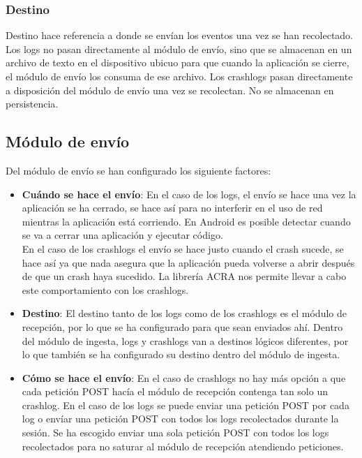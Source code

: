 \subsubsection{Destino}
Destino hace referencia a donde se envían los eventos una vez se han recolectado. 
Los logs no pasan directamente al módulo de envío, sino que se almacenan en un archivo de texto en el dispositivo ubicuo para que cuando la aplicación se cierre, el módulo de envío los consuma de ese archivo.
Los crashlogs pasan directamente a disposición del módulo de envío una vez se recolectan. No se almacenan en persistencia. 

\subsection{Módulo de envío}

Del módulo de envío se han configurado los siguiente factores:

\begin{itemize}
	\item \textbf{Cuándo se hace el envío}: En el caso de los logs, el envío se hace una vez la aplicación se ha cerrado, se hace así para no interferir en el uso de red mientras la aplicación está corriendo. En Android es posible detectar cuando se va a cerrar una aplicación y ejecutar código. \\ En el caso de los crashlogs el envío se hace justo cuando el crash sucede, se hace así ya que nada asegura que la aplicación pueda volverse a abrir después de que un crash haya sucedido. La librería ACRA nos permite llevar a cabo este comportamiento con los crashlogs.
	
	\item \textbf{Destino}: El destino tanto de los logs como de los crashlogs es el módulo de recepción, por lo que se ha configurado para que sean enviados ahí. Dentro del módulo de ingesta, logs y crashlogs van a destinos lógicos diferentes, por lo que también se ha configurado su destino dentro del módulo de ingesta.
	
	\item \textbf{Cómo se hace el envío}: En el caso de crashlogs no hay más opción a que cada petición POST hacía el módulo de recepción contenga tan solo un crashlog. En el caso de los logs se puede enviar una petición POST por cada log o envíar una petición POST con todos los logs recolectados durante la sesión. Se ha escogido enviar una sola petición POST con todos los logs recolectados para no saturar al módulo de recepción atendiendo peticiones.
\end{itemize}












